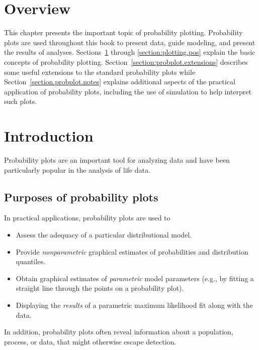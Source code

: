 \section*{Overview}
This chapter presents the important
topic of probability plotting. Probability plots are used throughout
this book to present data, guide modeling, and present the results of
analyses.  Sections~\ref{section:probplot.intro} through
\ref{section:plotting.pos} 
explain the basic concepts of probability plotting.
Section~\ref{section:probplot.extensions} describes some useful
extensions to the standard probability plots while
Section~\ref{section.probplot.notes} explains additional aspects of the
practical application of probability plots, including the use of
simulation to help interpret such plots.

\section{Introduction}
\label{section:probplot.intro}
Probability plots are an important tool for analyzing data and have
been particularly popular in the analysis of life data.

\subsection{Purposes of probability plots}
\label{section:prob.plot.purposes}
In practical applications, probability plots are used to
\begin{itemize}
\item
Assess the adequacy of a particular distributional model.
\item
Provide {\em nonparametric} graphical estimates of probabilities and
distribution quantiles. 
\item
Obtain graphical estimates of {\em parametric} model parameters (e.g., by 
fitting a straight line through the points on a probability plot).
\item
Displaying the {\em results} of a parametric
maximum likelihood fit along with the data.

\end{itemize}
In addition, probability plots often reveal information about a population,
process, or data, that might otherwise escape detection.
